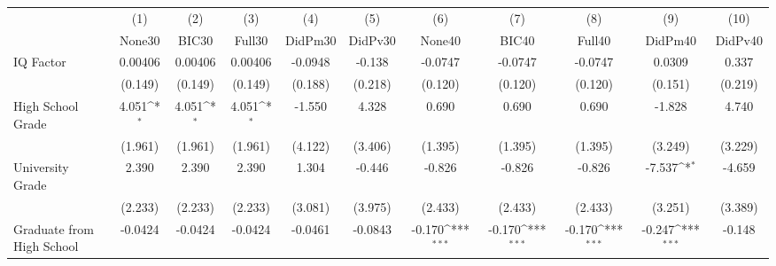 {
\def\sym#1{\ifmmode^{#1}\else\(^{#1}\)\fi}
\begin{tabular}{l*{10}{c}}
\toprule
            &\multicolumn{1}{c}{(1)}&\multicolumn{1}{c}{(2)}&\multicolumn{1}{c}{(3)}&\multicolumn{1}{c}{(4)}&\multicolumn{1}{c}{(5)}&\multicolumn{1}{c}{(6)}&\multicolumn{1}{c}{(7)}&\multicolumn{1}{c}{(8)}&\multicolumn{1}{c}{(9)}&\multicolumn{1}{c}{(10)}\\
            &\multicolumn{1}{c}{None30}&\multicolumn{1}{c}{BIC30}&\multicolumn{1}{c}{Full30}&\multicolumn{1}{c}{DidPm30}&\multicolumn{1}{c}{DidPv30}&\multicolumn{1}{c}{None40}&\multicolumn{1}{c}{BIC40}&\multicolumn{1}{c}{Full40}&\multicolumn{1}{c}{DidPm40}&\multicolumn{1}{c}{DidPv40}\\
\midrule
IQ Factor   &     0.00406         &     0.00406         &     0.00406         &     -0.0948         &      -0.138         &     -0.0747         &     -0.0747         &     -0.0747         &      0.0309         &       0.337         \\
            &     (0.149)         &     (0.149)         &     (0.149)         &     (0.188)         &     (0.218)         &     (0.120)         &     (0.120)         &     (0.120)         &     (0.151)         &     (0.219)         \\
\addlinespace
High School Grade&       4.051\sym{*}  &       4.051\sym{*}  &       4.051\sym{*}  &      -1.550         &       4.328         &       0.690         &       0.690         &       0.690         &      -1.828         &       4.740         \\
            &     (1.961)         &     (1.961)         &     (1.961)         &     (4.122)         &     (3.406)         &     (1.395)         &     (1.395)         &     (1.395)         &     (3.249)         &     (3.229)         \\
\addlinespace
University Grade&       2.390         &       2.390         &       2.390         &       1.304         &      -0.446         &      -0.826         &      -0.826         &      -0.826         &      -7.537\sym{*}  &      -4.659         \\
            &     (2.233)         &     (2.233)         &     (2.233)         &     (3.081)         &     (3.975)         &     (2.433)         &     (2.433)         &     (2.433)         &     (3.251)         &     (3.389)         \\
\addlinespace
Graduate from High School&     -0.0424         &     -0.0424         &     -0.0424         &     -0.0461         &     -0.0843         &      -0.170\sym{***}&      -0.170\sym{***}&      -0.170\sym{***}&      -0.247\sym{***}&      -0.148         \\

\end{tabular}}
